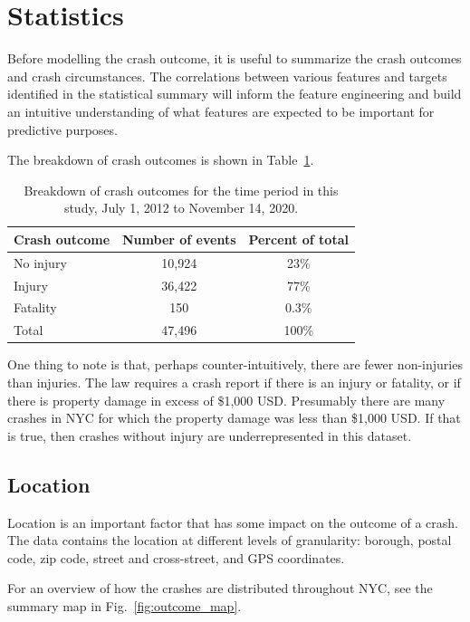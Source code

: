 \documentclass[twocolumn,oneside]{article}
\begin{document}
\section{Statistics}

Before modelling the crash outcome, it is useful to summarize the
crash outcomes and crash circumstances.  The correlations between
various features and targets identified in the statistical summary
will inform the feature engineering and build an intuitive
understanding of what features are expected to be important for
predictive purposes.

The breakdown of crash outcomes is shown in
Table~\ref{tab:crash_numbers}.

\begin{table}[h]
\centering
\begin{tabular}{l | c | c}
\hline \hline
Crash outcome & Number of events & Percent of total \\
\hline \hline
No injury  & 10,924 &  23\% \\ 
Injury     & 36,422 &  77\%  \\ 
Fatality   &    150 &  0.3\%  \\ \hline
Total      & 47,496 &  100\% \\
  \hline \hline
\end{tabular}
\caption{Breakdown of crash outcomes for the time period in this
  study, July 1, 2012 to November 14, 2020.}
\label{tab:crash_numbers}
\end{table}

One thing to note is that, perhaps counter-intuitively, there are
fewer non-injuries than injuries.  The law requires a crash report if
there is an injury or fatality, or if there is property damage in
excess of \$1,000 USD.  Presumably there are many crashes in NYC for
which the property damage was less than \$1,000 USD.  If that is true,
then crashes without injury are underrepresented in this dataset.

\subsection{Location}

Location is an important factor that has some impact on the outcome of
a crash.  The data contains the location at different levels of
granularity: borough, postal code, zip code, street and cross-street,
and GPS coordinates.

For an overview of how the crashes are distributed throughout NYC, see
the summary map in Fig.~\ref{fig:outcome_map}.
\end{document}
